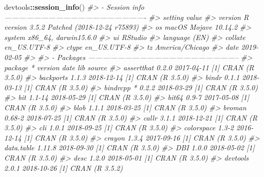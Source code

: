 \documentclass{book}
\newenvironment{Shaded}{\begin{snugshade}}{\end{snugshade}}
\newcommand{\CommentTok}[1]{\textcolor[rgb]{0.56,0.35,0.01}{\textit{#1}}}
\newcommand{\KeywordTok}[1]{\textcolor[rgb]{0.13,0.29,0.53}{\textbf{#1}}}
\newcommand{\NormalTok}[1]{#1}
\newcommand{\OperatorTok}[1]{\textcolor[rgb]{0.81,0.36,0.00}{\textbf{#1}}}
\begin{document}
\begin{Shaded}
\begin{Highlighting}[]
\NormalTok{devtools}\OperatorTok{::}\KeywordTok{session_info}\NormalTok{()}
\CommentTok{#> - Session info ----------------------------------------------------------}
\CommentTok{#>  setting  value                                      }
\CommentTok{#>  version  R version 3.5.2 Patched (2018-12-24 r75893)}
\CommentTok{#>  os       macOS Mojave 10.14.2                       }
\CommentTok{#>  system   x86_64, darwin15.6.0                       }
\CommentTok{#>  ui       RStudio                                    }
\CommentTok{#>  language (EN)                                       }
\CommentTok{#>  collate  en_US.UTF-8                                }
\CommentTok{#>  ctype    en_US.UTF-8                                }
\CommentTok{#>  tz       America/Chicago                            }
\CommentTok{#>  date     2019-02-05                                 }
\CommentTok{#> }
\CommentTok{#> - Packages --------------------------------------------------------------}
\CommentTok{#>  package     * version    date       lib source                           }
\CommentTok{#>  assertthat    0.2.0      2017-04-11 [1] CRAN (R 3.5.0)                   }
\CommentTok{#>  backports     1.1.3      2018-12-14 [1] CRAN (R 3.5.0)                   }
\CommentTok{#>  bindr         0.1.1      2018-03-13 [1] CRAN (R 3.5.0)                   }
\CommentTok{#>  bindrcpp    * 0.2.2      2018-03-29 [1] CRAN (R 3.5.0)                   }
\CommentTok{#>  bit           1.1-14     2018-05-29 [1] CRAN (R 3.5.0)                   }
\CommentTok{#>  bit64         0.9-7      2017-05-08 [1] CRAN (R 3.5.0)                   }
\CommentTok{#>  blob          1.1.1      2018-03-25 [1] CRAN (R 3.5.0)                   }
\CommentTok{#>  broman        0.68-2     2018-07-25 [1] CRAN (R 3.5.0)                   }
\CommentTok{#>  callr         3.1.1      2018-12-21 [1] CRAN (R 3.5.0)                   }
\CommentTok{#>  cli           1.0.1      2018-09-25 [1] CRAN (R 3.5.0)                   }
\CommentTok{#>  colorspace    1.3-2      2016-12-14 [1] CRAN (R 3.5.0)                   }
\CommentTok{#>  crayon        1.3.4      2017-09-16 [1] CRAN (R 3.5.0)                   }
\CommentTok{#>  data.table    1.11.8     2018-09-30 [1] CRAN (R 3.5.0)                   }
\CommentTok{#>  DBI           1.0.0      2018-05-02 [1] CRAN (R 3.5.0)                   }
\CommentTok{#>  desc          1.2.0      2018-05-01 [1] CRAN (R 3.5.0)                   }
\CommentTok{#>  devtools      2.0.1      2018-10-26 [1] CRAN (R 3.5.2)                   }

\end{Highlighting}
\end{Shaded}
\end{document}
